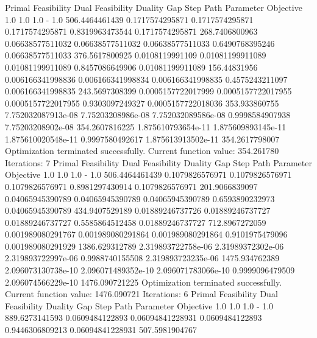 \documentclass[letterpaper,10pt,english]{sphinxmanual}
\begin{document}
{
\begin{sphinxVerbatim}[commandchars=\\\{\}]
Primal Feasibility  Dual Feasibility    Duality Gap         Step             Path Parameter      Objective
1.0                 1.0                 1.0                 -                1.0                 506.4464461439
0.1717574295871     0.1717574295871     0.1717574295871     0.8319963473544  0.1717574295871     268.7406800963
0.06638577511032    0.06638577511032    0.06638577511033    0.6490768395246  0.06638577511033    376.5617800925
0.0108119991109     0.01081199911089    0.01081199911089    0.8457086649906  0.01081199911089    156.44831956
0.006166341998836   0.006166341998834   0.006166341998835   0.4575243211097  0.006166341998835   243.5697308399
0.0005157722017999  0.0005157722017955  0.0005157722017955  0.9303097249327  0.0005157722018036  353.933860755
7.752032087913e-08  7.75203208986e-08   7.752032089586e-08  0.9998584907938  7.75203208902e-08   354.2607816225
1.875610793654e-11  1.875609893145e-11  1.875610020548e-11  0.9997580492617  1.875613913502e-11  354.2617798007
Optimization terminated successfully.
         Current function value: 354.261780
         Iterations: 7
Primal Feasibility  Dual Feasibility    Duality Gap         Step             Path Parameter      Objective
1.0                 1.0                 1.0                 -                1.0                 506.4464461439
0.1079826576971     0.1079826576971     0.1079826576971     0.8981297430914  0.1079826576971     201.9066839097
0.04065945390789    0.04065945390789    0.04065945390789    0.6593890232973  0.04065945390789    434.9407529189
0.01889246737726    0.01889246737727    0.01889246737727    0.5585864512458  0.01889246737727    712.8967272059
0.001989080291767   0.001989080291864   0.001989080291864   0.9101975479096  0.001989080291929   1386.629312789
2.319893722758e-06  2.31989372302e-06   2.319893722997e-06  0.9988740155508  2.319893723235e-06  1475.934762389
2.096073130738e-10  2.096071489352e-10  2.096071783066e-10  0.9999096479509  2.096074566229e-10  1476.090721225
Optimization terminated successfully.
         Current function value: 1476.090721
         Iterations: 6
Primal Feasibility  Dual Feasibility    Duality Gap         Step             Path Parameter      Objective
1.0                 1.0                 1.0                 -                1.0                 889.6273141593
0.0609484122893     0.06094841228931    0.0609484122893     0.9446306809213  0.06094841228931    507.5981904767

\end{sphinxVerbatim}}
\end{document}
